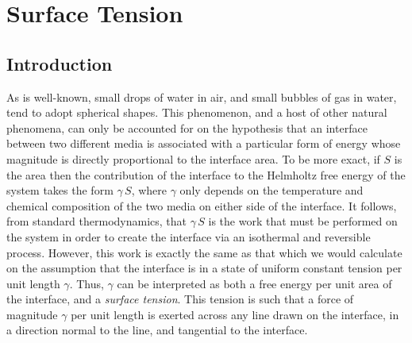 \chapter{Surface Tension}\label{c6x}
\section{Introduction}\label{s6x1}
As is well-known, small drops of water in air, and small bubbles of gas in water, tend to adopt  spherical shapes.
This phenomenon, and a host of other natural phenomena, can  only be accounted for on the hypothesis that an interface between two different media is associated with a
particular form of energy whose magnitude is directly proportional to the interface area.
To be more exact, if $S$ is the  area then the contribution of the interface to the Helmholtz free energy
of the system takes the form $\gamma\,S$, where  $\gamma$ only depends  on the temperature and  
chemical composition
of the two media on either side of the interface. It follows, from standard thermodynamics, that $\gamma\,S$ is the work that
must be performed on the system in order to create the
interface via an isothermal and reversible process. However, this work is exactly the same as that which we would calculate
on the assumption that the interface is in a state of uniform constant tension per unit length $\gamma$. Thus, $\gamma$
can be interpreted as both a free energy per unit area of the interface, and a {\em surface tension}. This
 tension is such that a force of magnitude
$\gamma$ per unit length is exerted across any line drawn on the interface,  in a direction normal to the line, and tangential to 
the interface. 

